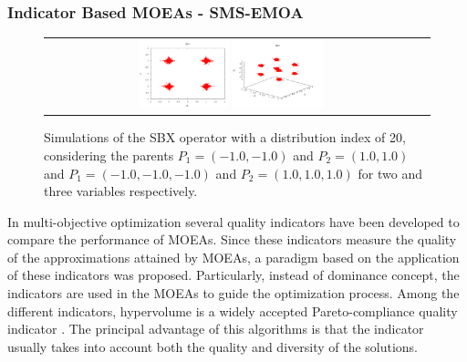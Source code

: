 \subsubsection{Indicator Based MOEAs - SMS-EMOA}
\begin{figure}[t]
\centering
\begin{tabular}{cc}
   \includegraphics[width=0.25\textwidth]{img/SBX_eta_20_2D.png} 
   \includegraphics[width=0.25\textwidth]{img/SBX_eta_20_3D.png} 
\end{tabular}
\caption{Simulations of the SBX operator with a distribution index of 20, considering the parents $P_1=(-1.0, -1.0)$ and $P_2=(1.0, 1.0)$ and $P_1=(-1.0, -1.0, -1.0)$ and $P_2=(1.0, 1.0, 1.0)$ for two and three variables respectively.}
\label{fig:Simulations_Index_20}
\end{figure}
In multi-objective optimization several quality indicators have been developed to compare the performance of MOEAs.
%
Since these indicators measure the quality of the approximations attained by MOEAs, a paradigm based on the application of these indicators was proposed.
%
Particularly, instead of dominance concept, the indicators are used in the MOEAs to guide the optimization process.
%
Among the different indicators, hypervolume is a widely accepted Pareto-compliance quality indicator \cite{Joel:IGDPlus_And_GDPlus}.
%
The principal advantage of this algorithms is that the indicator usually takes into account both the quality and diversity of the solutions.
%


